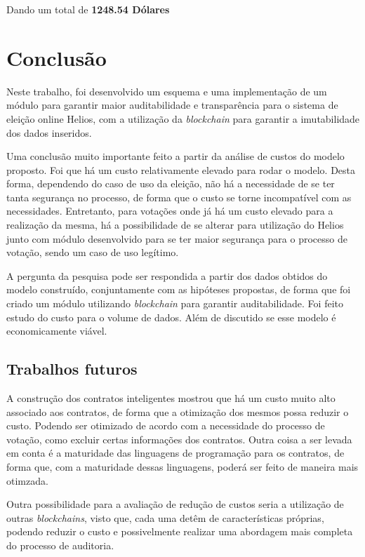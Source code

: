 \documentclass{ufsctex/ufsctex}
\begin{document}
Dando um total de \textbf{1248.54 Dólares}

\chapter{Conclusão}
Neste trabalho, foi desenvolvido um esquema e uma implementação de um módulo
para garantir maior auditabilidade e transparência para o sistema de eleição
online Helios, com a utilização da \textit{blockchain} para garantir a
imutabilidade dos dados inseridos. 

Uma conclusão muito importante feito a partir da análise de custos do modelo
proposto. Foi que há um custo relativamente elevado para rodar o modelo. Desta
forma, dependendo do caso de uso da eleição, não há a necessidade de se ter
tanta segurança no processo, de forma que o custo se torne incompatível com as
necessidades.  Entretanto, para votações onde já há um custo elevado para a
realização da mesma, há a possibilidade de se alterar para utilização do Helios
junto com módulo desenvolvido para se ter maior segurança para o processo de
votação, sendo um caso de uso legítimo.

A pergunta da pesquisa pode ser respondida a partir dos dados obtidos do modelo
construído, conjuntamente com as hipóteses propostas, de forma que foi criado
um módulo utilizando \textit{blockchain} para garantir auditabilidade. Foi feito
estudo do custo para o volume de dados. Além de discutido se esse modelo é
economicamente viável.

\section{Trabalhos futuros} 

A construção dos contratos inteligentes mostrou que há um custo muito alto
associado aos contratos, de forma que a otimização dos mesmos possa reduzir o
custo. Podendo ser otimizado de acordo com a necessidade do processo de
votação, como excluir certas informações dos contratos. Outra coisa a ser
levada em conta é a maturidade das linguagens de programação para os contratos,
de forma que, com a maturidade dessas linguagens, poderá ser feito de maneira
mais otimzada.

Outra possibilidade para a avaliação de redução de custos seria a utilização de
outras \textit{blockchains}, visto que, cada uma detêm de características
próprias, podendo reduzir o custo e possivelmente realizar uma abordagem mais
completa do processo de auditoria.
\end{document}
